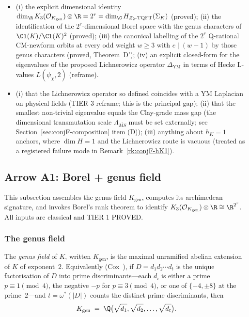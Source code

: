 \begin{itemize}
\item[\textbf{Claimed.}] (i) the explicit dimensional identity
   $\dim_\R K_3(\mathcal{O}_{K_{\mathrm{gen}}}) \otimes \R = 2^r
   = \dim_\C H_{Z_2\text{-TQFT}}(\Sigma_K)$ (proved); (ii) the
   identification of the $2^r$-dimensional Borel space with the genus
   characters of $\Cl(K)/\Cl(K)^2$ (proved); (iii) the canonical
   labelling of the $2^r$ Q-rational CM-newform orbits at every odd
   weight $w \ge 3$ with $e \mid (w-1)$ by those genus characters
   (proved, Theorem~D'); (iv) an explicit closed-form for the
   eigenvalues of the proposed Lichnerowicz operator
   $\Delta_{\mathrm{YM}}$ in terms of Hecke L-values $L(\psi_\chi, 2)$
   (reframe).
\item[\textbf{Not claimed.}] (i) that the Lichnerowicz operator so
   defined coincides with a YM Laplacian on physical fields
   (TIER 3 reframe; this is the principal gap); (ii) that the smallest
   non-trivial eigenvalue equals the Clay-grade mass gap (the
   dimensional transmutation scale $\Lambda_{\overline{MS}}$ must be
   set externally; see Section~\ref{sec:conjF-composition} item (D));
   (iii) anything about $h_K = 1$ anchors, where $\dim H = 1$ and the
   Lichnerowicz route is vacuous (treated as a registered failure mode
   in Remark~\ref{rk:conjF-hK1}).
\end{itemize}

\subsection{Arrow A1: Borel + genus field}
\label{sec:conjF-borel}

This subsection assembles the genus field $K_{\mathrm{gen}}$, computes
its archimedean signature, and invokes Borel's rank theorem to
identify $K_3(\mathcal{O}_{K_{\mathrm{gen}}}) \otimes \R \cong
\R^{2^r}$.  All inputs are classical and TIER 1 PROVED.

\subsubsection{The genus field}
\label{sec:conjF-borel-genus}

\begin{definition}\label{def:genusfield}
The \emph{genus field} of $K$, written $K_{\mathrm{gen}}$, is the
maximal unramified abelian extension of $K$ of exponent~$2$.
Equivalently (Cox~\cite[Thm.~6.1]{Cox1989}), if $D = d_1 d_2 \cdots
d_t$ is the unique factorisation of $D$ into prime
discriminants---each $d_i$ is either a prime $p \equiv 1 \pmod 4$, the
negative $-p$ for $p \equiv 3 \pmod 4$, or one of $\{-4, \pm 8\}$ at
the prime~$2$---and $t = \omega^*(|D|)$ counts the distinct prime
discriminants, then
\[
   K_{\mathrm{gen}} \;=\; \Q\bigl(\sqrt{d_1}, \sqrt{d_2}, \ldots,
   \sqrt{d_t}\bigr).
\]
\end{definition}

